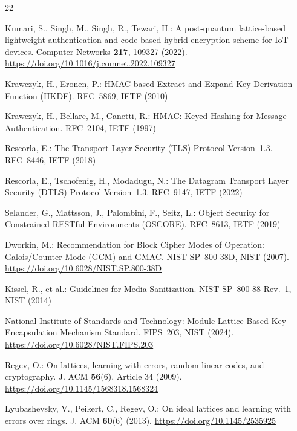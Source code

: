 \documentclass[runningheads]{llncs}
\begin{document}
\begin{thebibliography}{22}

Kumari, S., Singh, M., Singh, R., Tewari, H.: A post-quantum lattice-based
lightweight authentication and code-based hybrid encryption scheme for {IoT}
devices. Computer Networks \textbf{217}, 109327 (2022).
\url{https://doi.org/10.1016/j.comnet.2022.109327}

Krawczyk, H., Eronen, P.: {HMAC}-based Extract-and-Expand Key Derivation
Function ({HKDF}). RFC~5869, IETF (2010)

Krawczyk, H., Bellare, M., Canetti, R.: {HMAC}: Keyed-Hashing for Message
Authentication. RFC~2104, IETF (1997)

Rescorla, E.: The Transport Layer Security ({TLS}) Protocol Version~1.3.
RFC~8446, IETF (2018)

Rescorla, E., Tschofenig, H., Modadugu, N.: The Datagram Transport Layer
Security ({DTLS}) Protocol Version~1.3. RFC~9147, IETF (2022)

Selander, G., Mattsson, J., Palombini, F., Seitz, L.: Object Security for
Constrained {RESTful} Environments ({OSCORE}). RFC~8613, IETF (2019)

Dworkin, M.: Recommendation for Block Cipher Modes of Operation: {Galois/Counter
Mode (GCM) and GMAC}. NIST SP~800-38D, NIST (2007).
\url{https://doi.org/10.6028/NIST.SP.800-38D}

Kissel, R., et al.: Guidelines for Media Sanitization. NIST SP~800-88 Rev.~1,
NIST (2014)

National Institute of Standards and Technology: Module-Lattice-Based
Key-Encapsulation Mechanism Standard. FIPS~203, NIST (2024).
\url{https://doi.org/10.6028/NIST.FIPS.203}

Regev, O.: On lattices, learning with errors, random linear codes, and
cryptography. J. ACM \textbf{56}(6), Article 34 (2009).
\url{https://doi.org/10.1145/1568318.1568324}

Lyubashevsky, V., Peikert, C., Regev, O.: On ideal lattices and learning with
errors over rings. J. ACM \textbf{60}(6) (2013).
\url{https://doi.org/10.1145/2535925}


\end{thebibliography}
\end{document}
